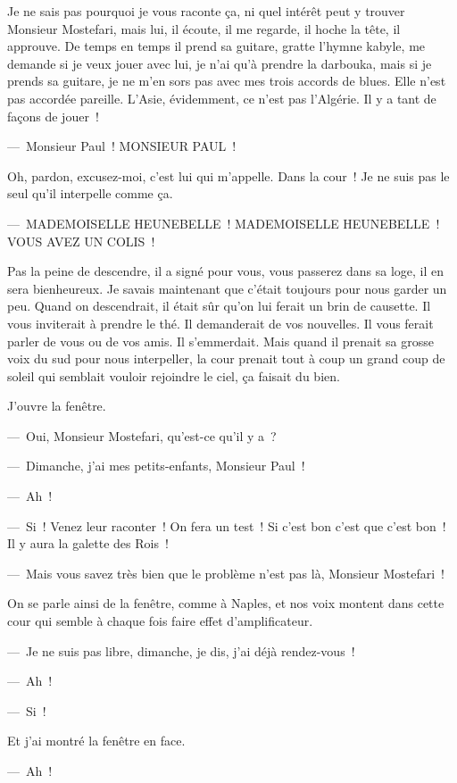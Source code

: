 \documentclass[french,twoside]{book} %
\begin{document}
\noindent Je ne sais pas pourquoi je vous raconte ça, ni quel intérêt peut y trouver Monsieur Mostefari, mais lui, il écoute, il me regarde, il hoche la tête, il approuve. De temps en temps il prend sa guitare, gratte l’hymne kabyle, me demande si je veux jouer avec lui, je n’ai qu’à prendre la darbouka, mais si je prends sa guitare, je ne m’en sors pas avec mes trois accords de blues. Elle n’est pas accordée pareille. L’Asie, évidemment, ce n’est pas l’Algérie. Il y a tant de façons de jouer !\par
— Monsieur Paul ! MONSIEUR PAUL !\par
Oh, pardon, excusez-moi, c’est lui qui m’appelle. Dans la cour ! Je ne suis pas le seul qu’il interpelle comme ça.\par
— MADEMOISELLE HEUNEBELLE ! MADEMOISELLE HEUNEBELLE ! VOUS AVEZ UN COLIS !\par
Pas la peine de descendre, il a signé pour vous, vous passerez dans sa loge, il en sera bienheureux. Je savais maintenant que c’était toujours pour nous garder un peu. Quand on descendrait, il était sûr qu’on lui ferait un brin de causette. Il vous inviterait à prendre le thé. Il demanderait de vos nouvelles. Il vous ferait parler de vous ou de vos amis. Il s’emmerdait. Mais quand il prenait sa grosse voix du sud pour nous interpeller, la cour prenait tout à coup un grand coup de soleil qui semblait vouloir rejoindre le ciel, ça faisait du bien.\par
J’ouvre la fenêtre.\par
— Oui, Monsieur Mostefari, qu’est-ce qu’il y a ?\par
— Dimanche, j’ai mes petits-enfants, Monsieur Paul !\par
— Ah !\par
— Si ! Venez leur raconter ! On fera un test ! Si c’est bon c’est que c’est bon ! Il y aura la galette des Rois !\par
— Mais vous savez très bien que le problème n’est pas là, Monsieur Mostefari !\par
On se parle ainsi de la fenêtre, comme à Naples, et nos voix montent dans cette cour qui semble à chaque fois faire effet d’amplificateur.\par
— Je ne suis pas libre, dimanche, je dis, j’ai déjà rendez-vous !\par
— Ah !\par
— Si !\par
Et j’ai montré la fenêtre en face.\par
— Ah !\par
\end{document}

